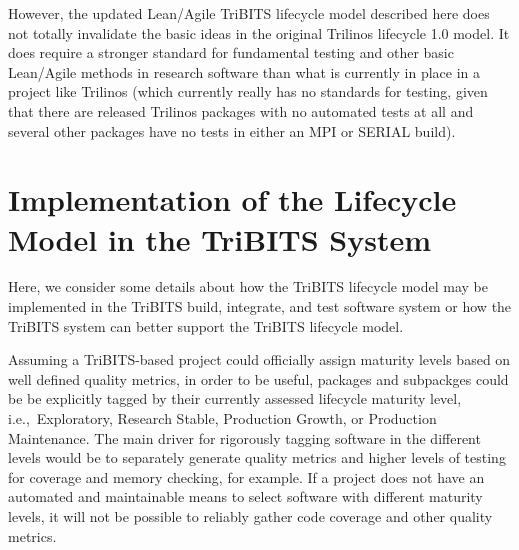 \documentclass[11pt]{SANDreport}
\begin{document}
However, the updated Lean/Agile TriBITS lifecycle model described here does not totally invalidate the basic ideas in the original Trilinos lifecycle 1.0 model. It does require a stronger standard for fundamental testing and other basic Lean/Agile methods in research software than what is currently in place in a project like Trilinos (which currently really has no standards for testing, given that there are released Trilinos packages with no automated tests at all and several other packages have no tests in either an MPI or SERIAL build).


%
\section{Implementation of the Lifecycle Model in the TriBITS System}
\label{sec:implementation_in_tribits}
%

Here, we consider some details about how the TriBITS lifecycle model may be implemented in the TriBITS build, integrate, and test software system or how the TriBITS system can better support the TriBITS lifecycle model.

Assuming a TriBITS-based project could officially assign maturity levels based on well defined quality metrics, in order to be useful, packages and subpackges could be be explicitly tagged by their currently assessed lifecycle maturity level, i.e.,\ Exploratory, Research Stable, Production Growth, or Production Maintenance.  The main driver for rigorously tagging software in the different levels would be to separately generate quality metrics and higher levels of testing for coverage and memory checking, for example.  If a project does not have an automated and maintainable means to select software with different maturity levels, it will not be possible to reliably gather code coverage and other quality metrics.
\end{document}
